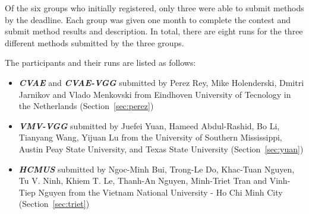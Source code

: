 \documentclass[../main.tex]{subfiles}
\begin{document}
Of the six groups who initially registered, only three were able to submit methods by the deadline. Each group was given one month to complete the contest and  submit method results and description. In total, there are eight runs for the three different methods submitted by the three groups. 

The participants and their runs are listed as follows:

\begin{itemize}
	
	\item  \textbf{\textit{CVAE}} and \textbf{\textit{CVAE-VGG}} submitted by Perez Rey, Mike Holenderski, Dmitri Jarnikov and Vlado Menkovski from Eindhoven University of Tecnology in the Netherlands (Section~\ref{sec:perez})
	
	\item  \textbf{\textit{VMV-VGG}} submitted by Juefei Yuan, Hameed Abdul-Rashid, Bo Li, Tianyang Wang, Yijuan Lu from the University of Southern Mississippi, Austin Peay State University, and Texas State University (Section~\ref{sec:yuan})
	
	\item  \textbf{\textit{HCMUS}} submitted by 
	Ngoc-Minh Bui, Trong-Le Do, Khac-Tuan Nguyen, Tu V. Ninh, Khiem T. Le, Thanh-An Nguyen, Minh-Triet Tran and Vinh-Tiep Nguyen from the Vietnam National University - Ho Chi Minh City (Section~\ref{sec:triet})

\end{itemize}
\end{document}
